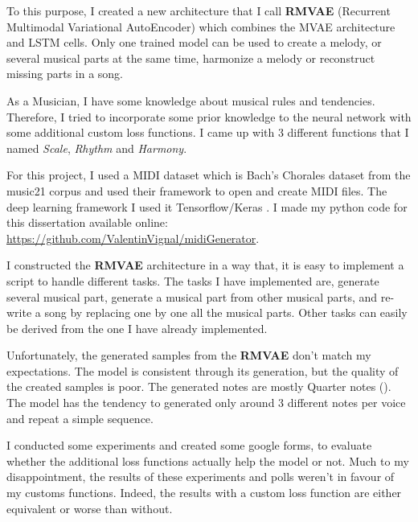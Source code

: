 \documentclass[12pt]{report}
\begin{document}
To this purpose, I created a new architecture that I call \textbf{RMVAE} (Recurrent Multimodal Variational AutoEncoder) which combines the MVAE architecture \cite{wu_multimodal_2018} and LSTM cells.
Only one trained model can be used to create a melody, or several musical parts at the same time, harmonize a melody or reconstruct missing parts in a song.

As a Musician, I have some knowledge about musical rules and tendencies.
Therefore, I tried to incorporate some prior knowledge to the neural network with some additional custom loss functions.
I came up with 3 different functions that I named \textit{Scale}, \textit{Rhythm} and \textit{Harmony}.

For this project, I used a MIDI dataset which is Bach's Chorales dataset from the music21 corpus \cite{noauthor_music21corpuschorales_nodate} and used their framework \cite{noauthor_music21_nodate} to open and create MIDI files.
The deep learning framework I used it Tensorflow/Keras \cite{noauthor_tensorflow_nodate, noauthor_keras_nodate}.
I made my python code for this dissertation available online: \url{https://github.com/ValentinVignal/midiGenerator}.

I constructed the \textbf{RMVAE} architecture in a way that, it is easy to implement a script to handle different tasks.
The tasks I have implemented are, generate several musical part, generate a musical part from other musical parts, and re-write a song by replacing one by one all the musical parts.
Other tasks can easily be derived from the one I have already implemented.

Unfortunately, the generated samples from the \textbf{RMVAE} don't match my expectations.
The model is consistent through its generation, but the quality of the created samples is poor.
The generated notes are mostly Quarter notes (\musQuarter).
The model has the tendency to generated only around 3 different notes per voice and repeat a simple sequence.

I conducted some experiments and created some google forms, to evaluate whether the additional loss functions actually help the model or not.
Much to my disappointment, the results of these experiments and polls weren't in favour of my customs functions.
Indeed, the results with a custom loss function are either equivalent or worse than without.


\end{document}
